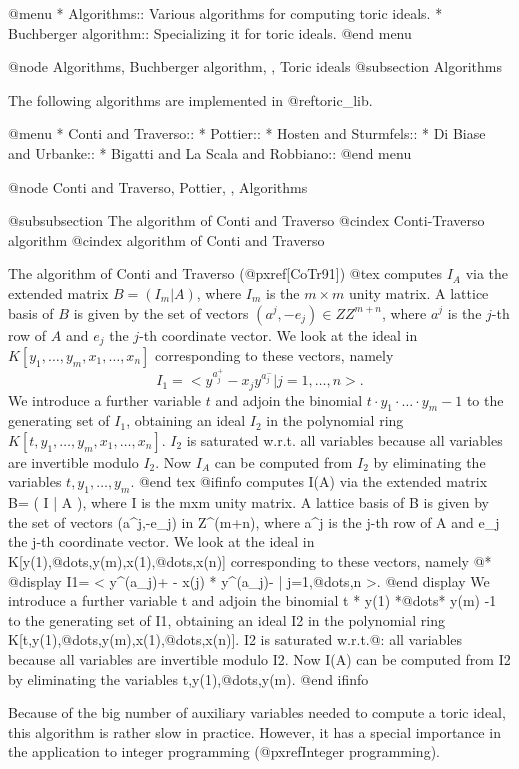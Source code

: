 @menu
* Algorithms::             Various algorithms for computing toric ideals.
* Buchberger algorithm::   Specializing it for toric ideals.
@end menu

@node Algorithms, Buchberger algorithm, , Toric ideals
@subsection Algorithms

The following algorithms are implemented in @ref{toric_lib}.

@menu
* Conti and Traverso::
* Pottier::
* Hosten and Sturmfels::
* Di Biase and Urbanke::
* Bigatti and La Scala and Robbiano::
@end menu

@node Conti and Traverso, Pottier, , Algorithms

@subsubsection The algorithm of Conti and Traverso
@cindex Conti-Traverso algorithm
@cindex algorithm of Conti and Traverso


The algorithm of Conti and Traverso (@pxref{[CoTr91]})
@tex
computes $I_A$ via the
extended matrix $B=(I_m|A)$,
where $I_m$ is the $m\times m$ unity matrix. A lattice basis of $B$ is
given by the set of vectors $(a^j,-e_j)\in Z\!\!\! Z^{m+n}$, where $a^j$
is the $j$-th row of $A$ and $e_j$ the $j$-th coordinate vector. We
look at the ideal in $K[y_1,\ldots,y_m,x_1,\ldots,x_n]$ corresponding to
these vectors, namely
$$ I_1=<y^{a_j^+}- x_j y^{a_j^-} | j=1,\ldots, n>.$$
We introduce a further variable $t$ and adjoin the binomial $t\cdot
y_1\cdot\ldots\cdot y_m -1$ to the generating set of $I_1$, obtaining
an ideal $I_2$ in the polynomial ring $K[t,
y_1,\ldots,y_m,x_1,\ldots,x_n]$. $I_2$ is saturated w.r.t. all
variables because all variables are invertible modulo $I_2$. Now $I_A$
can be computed from $I_2$ by eliminating the variables
$t,y_1,\ldots,y_m$.
@end tex
@ifinfo
computes I(A) via the extended matrix B= ( I | A ),
where I is the mxm unity matrix. A lattice basis of B is given by the
set of vectors (a^j,-e_j) in Z^(m+n), where a^j is the j-th row of A and
e_j the j-th coordinate vector. We look at the ideal in
K[y(1),@dots{},y(m),x(1),@dots{},x(n)] corresponding to these vectors,
namely @*
@display
I1= < y^(a_j)+ - x(j) * y^(a_j)- | j=1,@dots{},n >.
@end display
We introduce a further variable t and adjoin the binomial t * y(1)
*@dots{}* y(m) -1 to the generating set of I1, obtaining an ideal I2 in
the polynomial ring K[t,y(1),@dots{},y(m),x(1),@dots{},x(n)]. I2 is
saturated w.r.t.@: all variables because all variables are invertible
modulo I2. Now I(A) can be computed from I2 by eliminating the variables
t,y(1),@dots{},y(m).
@end ifinfo

Because of the big number of auxiliary variables needed to compute a
toric ideal, this algorithm is rather slow in practice. However, it has
a special importance in the application to integer programming
(@pxref{Integer programming}).

